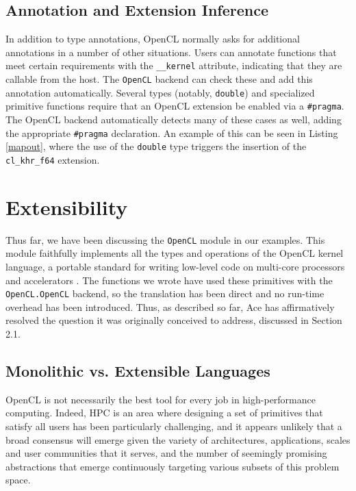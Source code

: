 \documentclass[9pt,preprint]{sigplanconf}
\begin{document}
\subsection{Annotation and Extension Inference}
In addition to type annotations, OpenCL normally asks for additional annotations in a number of other situations.  Users can annotate functions that meet certain requirements  with the \verb|__kernel| attribute, indicating that they are callable from the host. The \verb|OpenCL| backend can check these and add this annotation automatically. Several types (notably, \verb|double|) and specialized primitive functions require that an OpenCL extension be enabled via a \verb|#pragma|. The OpenCL backend automatically detects many of these cases as well, adding the appropriate \verb|#pragma| declaration. An example of this can be seen in Listing \ref{mapout}, where the use of the \verb|double| type triggers the insertion of the \verb|cl_khr_f64| extension.

\section{Extensibility}\label{att}
Thus far, we have been discussing the \verb|OpenCL| module in our examples. This module faithfully implements all the types and operations of the OpenCL kernel language, a portable standard for writing low-level code on multi-core processors and accelerators \cite{opencl11}. The functions we wrote have used these primitives with the \verb|OpenCL.OpenCL| backend, so the translation has been direct and no run-time overhead has been introduced. Thus, as described so far, Ace has affirmatively resolved the question it was originally conceived to address, discussed in Section 2.1. 

\subsection{Monolithic vs. Extensible Languages}
OpenCL is not necessarily the best tool for every job in high-performance computing. Indeed, HPC is an area where designing a set of primitives that satisfy all users has been particularly challenging, and it appears unlikely that a broad consensus will emerge given the variety of architectures, applications, scales and user communities that it serves, and the number of seemingly promising abstractions that emerge continuously targeting various subsets of this problem space.
\end{document}
